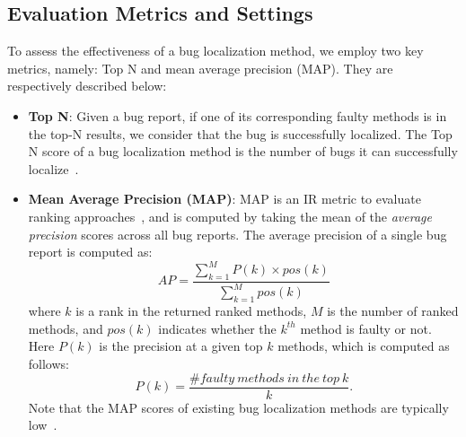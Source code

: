 

\subsection{Evaluation Metrics and Settings}
\label{sec:metrics}

To assess the effectiveness of a bug localization method, we employ two key metrics, namely: Top N and mean average precision (MAP). They are respectively described below:

\begin{itemize}
	\item  \textbf{Top N}: Given a bug report, if one of its corresponding faulty methods is in the top-N results, we consider that the bug is successfully localized. The Top N score of a bug localization method is the number of bugs it can successfully localize~\cite{Zhou:2012:BFM:2337223.2337226,SahaLKP13}.
	\item  \textbf{Mean Average Precision (MAP)}: MAP is an IR metric to evaluate ranking approaches~\cite{Manning2008}, and is computed by taking the mean of the {\em average precision} scores across all bug reports. The average precision of a single bug report is computed as:
	\[
	AP = \frac{\sum_{k=1}^{M}P(k) \times pos(k)}{\sum_{k=1}^{M} pos(k)}
	\]
	where $k$ is a rank in the returned ranked methods, $M$ is the number of ranked methods, and $pos(k)$ indicates whether the $k^{th}$ method is faulty or not. Here $P(k)$ is the precision at a given top $k$ methods, which is computed as follows:
	\[
	P(k)=\frac{\#faulty\ methods\ in\ the\ top\ k}{k}.
	\]
Note that the MAP scores of existing bug localization methods are typically low~\cite{Rao:2011:RSL:1985441.1985451,Sisman:2012:IVH:2664446.2664454,Zhou:2012:BFM:2337223.2337226,SahaLKP13}.
\end{itemize}


